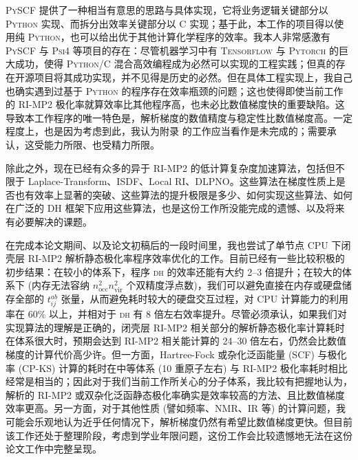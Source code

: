 \textsc{PySCF} 提供了一种相当有意思的思路与具体实现，它将业务逻辑关键部分以 \textsc{Python} 实现、而拆分出效率关键部分以 C 实现\cite{Sun-Chan.WCMS.2018, Sun-Chan.JCP.2020}；基于此，本工作的项目得以使用纯 \textsc{Python}，也可以给出优于其他计算化学程序的效率。我本人非常感激有 \textsc{PySCF} 与 \textsc{Psi4} 等项目的存在：尽管机器学习中有 \textsc{Tensorflow} 与 \textsc{Pytorch} 的巨大成功，使得 \textsc{Python/C} 混合高效编程成为必然可以实现的工程实践；但真的存在开源项目将其成功实现，并不见得是历史的必然。但在具体工程实现上，我自己也确实遇到过基于 \textsc{Python} 的程序存在效率瓶颈的问题；这也使得即使当前工作的 RI-MP2 极化率就算效率比其他程序高，也未必比数值梯度快的重要缺陷。这导致本工作程序的唯一特色是，解析梯度的数值精度与稳定性比数值梯度高。一定程度上，也是因为考虑到此，我认为附录  的工作应当看作是未完成的；需要承认，这受能力所限、也受精力所限。

除此之外，现在已经有众多的异于 RI-MP2 的低计算复杂度加速算法，包括但不限于 Laplace-Transform\cite{Almloef-Almloef.CPL.1991}、ISDF\cite{Dong-Lin.JCTC.2018, Qin-Yang.JPCA.2020}、Local RI\cite{Ihrig-Blum.NJP.2015}、DLPNO\cite{Riplinger-Neese.JCP.2013, Pinski-Neese.JCP.2015}。这些算法在梯度性质上是否也有效率上显著的突破、这些算法的提升极限是多少、如何实现这些算法、如何在广泛的 DH 框架下应用这些算法，也是这份工作所没能完成的遗憾、以及将来有必要解决的课题。

在完成本论文期间、以及论文初稿后的一段时间里，我也尝试了单节点 CPU 下闭壳层 RI-MP2 解析静态极化率程序效率优化的工作。目前已经有一些比较积极的初步结果：在较小的体系下，程序 \textsc{dh} 的效率还能有大约 2--3 倍提升；在较大的体系下 (内存无法容纳 $n_\mathrm{occ}^2 n_\mathrm{vir}^2$ 个双精度浮点数)，我们可以避免直接在内存或硬盘储存全部的 $t_{ij}^{ab}$ 张量，从而避免耗时较大的硬盘交互过程，对 CPU 计算能力的利用率在 60\% 以上，并相对于 \textsc{dh} 有 8 倍左右效率提升。尽管必须承认，如果我们对实现算法的理解是正确的，闭壳层 RI-MP2 相关部分的解析静态极化率计算耗时在体系很大时，预期会达到 RI-MP2 相关能计算的 24--30 倍左右，仍然会比数值梯度的计算代价高少许。但一方面，Hartree-Fock 或杂化泛函能量 (SCF) 与极化率 (CP-KS) 计算的耗时在中等体系 (10 重原子左右) 与 RI-MP2 极化率耗时相比经常是相当的；因此对于我们当前工作所关心的分子体系，我比较有把握地认为，解析的 RI-MP2 或双杂化泛函静态极化率确实是效率较高的方法、且比数值梯度效率更高。另一方面，对于其他性质 (譬如频率、NMR、IR 等) 的计算问题，我可能会乐观地认为近乎任何情况下，解析梯度仍然有希望比数值梯度更快。但目前该工作还处于整理阶段，考虑到学业年限问题，这份工作会比较遗憾地无法在这份论文工作中完整呈现。


